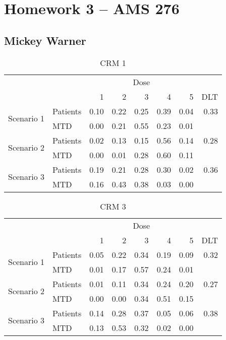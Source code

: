 \documentclass[12pt]{article}
\begin{document}
\section*{Homework 3 -- AMS 276}
\subsection*{Mickey Warner}
\bigskip
\bigskip


\begin{table}[ht]
\begin{center}
\begin{tabular}{llrrrrrr}
\hline\hline
& & \multicolumn{5}{c}{Dose} & \\
& & 1 & 2 & 3 & 4 & 5 & DLT \\  \hline
\multirow{2}{*}{Scenario 1} & Patients    & 0.10 & 0.22 & 0.25 & 0.39 & 0.04 & 0.33 \\
                            & MTD         & 0.00 & 0.21 & 0.55 & 0.23 & 0.01 &      \\
\multirow{2}{*}{Scenario 2} & Patients    & 0.02 & 0.13 & 0.15 & 0.56 & 0.14 & 0.28 \\
                            & MTD         & 0.00 & 0.01 & 0.28 & 0.60 & 0.11 &      \\
\multirow{2}{*}{Scenario 3} & Patients    & 0.19 & 0.21 & 0.28 & 0.30 & 0.02 & 0.36 \\
                            & MTD         & 0.16 & 0.43 & 0.38 & 0.03 & 0.00 &      \\
\hline\hline
\end{tabular}
\caption{CRM 1}
\end{center}
\end{table}

\begin{table}[ht]
\begin{center}
\begin{tabular}{llrrrrrr}
\hline\hline
& & \multicolumn{5}{c}{Dose} & \\
& & 1 & 2 & 3 & 4 & 5 & DLT \\  \hline
\multirow{2}{*}{Scenario 1} & Patients    & 0.05 & 0.22 & 0.34 & 0.19 & 0.09 & 0.32 \\
                            & MTD         & 0.01 & 0.17 & 0.57 & 0.24 & 0.01 &      \\
\multirow{2}{*}{Scenario 2} & Patients    & 0.01 & 0.11 & 0.34 & 0.24 & 0.20 & 0.27 \\
                            & MTD         & 0.00 & 0.00 & 0.34 & 0.51 & 0.15 &      \\
\multirow{2}{*}{Scenario 3} & Patients    & 0.14 & 0.28 & 0.37 & 0.05 & 0.06 & 0.38 \\
                            & MTD         & 0.13 & 0.53 & 0.32 & 0.02 & 0.00 &      \\
\hline\hline
\end{tabular}
\caption{CRM 3}
\end{center}
\end{table}
\end{document}
